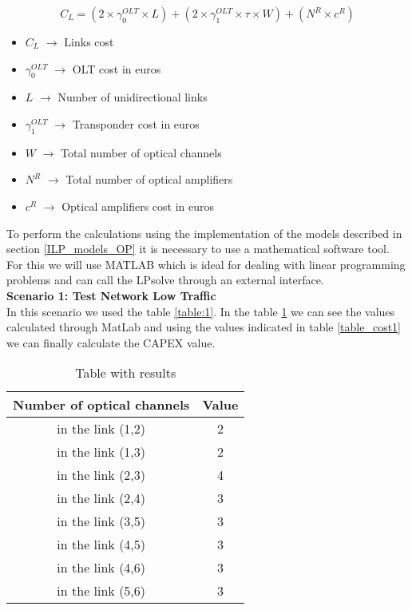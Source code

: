 \begin{equation}
C_L = \left(2 \times \gamma_0^{OLT} \times L\right) + \left(2 \times \gamma_1^{OLT} \times \tau \times W\right) + \left(N^R \times c^R\right)
\label{linkCosts}
\end{equation}	
	
\begin{itemize}
\item{$C_L$				$\rightarrow$	Links cost}
\item{$\gamma_0^{OLT}$	$\rightarrow$	OLT cost in euros}
\item{$L$				$\rightarrow$	Number of unidirectional links}
\item{$\gamma_1^{OLT}$	$\rightarrow$	Transponder cost in euros}
\item{$W$             $\rightarrow$	    Total number of optical channels}
\item{$N^R$				$\rightarrow$	Total number of optical amplifiers}
\item{$c^R$				$\rightarrow$	Optical amplifiers cost in euros}
\end{itemize}

\vspace{11pt}
To perform the calculations using the implementation of the models described in section \ref{ILP_models_OP} it is necessary to use a mathematical software tool. For this we will use MATLAB which is ideal for dealing with linear programming problems and can call the LPsolve through an external interface. \\

\textbf{Scenario 1: Test Network Low Traffic} \label{Scenario1_opaque} \\
In this scenario we used the table \ref{table:1}. In the table \ref{result_ILP1} we can see the values calculated through MatLab and using the values indicated in table \ref{table_cost1} we can finally calculate the CAPEX value. \\

\begin{table}[h!]
\centering
\begin{tabular}{|| c | c||}
 \hline
 Number of optical channels & Value \\
 \hline\hline
 in the link (1,2) & 2 \\
 in the link (1,3) & 2 \\
 in the link (2,3) & 4 \\
 in the link (2,4) & 3 \\
 in the link (3,5) & 3 \\
 in the link (4,5) & 3 \\
 in the link (4,6) & 3 \\
 in the link (5,6) & 3 \\
 \hline
\end{tabular}
\caption{Table with results}
\label{result_ILP1}
\end{table}



